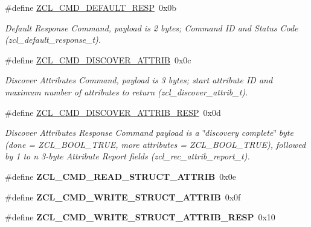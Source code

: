 \begin{DoxyCompactItemize}
\item 
\#define \hyperlink{group__zcl_ga92499f538455b8d5a525510fba54adb2}{Z\-C\-L\-\_\-\-C\-M\-D\-\_\-\-D\-E\-F\-A\-U\-L\-T\-\_\-\-R\-E\-S\-P}~0x0b
\begin{DoxyCompactList}\small\item\em Default Response Command, payload is 2 bytes; Command I\-D and Status Code (zcl\-\_\-default\-\_\-response\-\_\-t). \end{DoxyCompactList}\item 
\#define \hyperlink{group__zcl_ga2919d6fc8068efac4c9969938a4b9ff5}{Z\-C\-L\-\_\-\-C\-M\-D\-\_\-\-D\-I\-S\-C\-O\-V\-E\-R\-\_\-\-A\-T\-T\-R\-I\-B}~0x0c
\begin{DoxyCompactList}\small\item\em Discover Attributes Command, payload is 3 bytes; start attribute I\-D and maximum number of attributes to return (zcl\-\_\-discover\-\_\-attrib\-\_\-t). \end{DoxyCompactList}\item 
\#define \hyperlink{group__zcl_gae15c30229c1d8a8cdee1bd92b2cc6a15}{Z\-C\-L\-\_\-\-C\-M\-D\-\_\-\-D\-I\-S\-C\-O\-V\-E\-R\-\_\-\-A\-T\-T\-R\-I\-B\-\_\-\-R\-E\-S\-P}~0x0d
\begin{DoxyCompactList}\small\item\em Discover Attributes Response Command payload is a \char`\"{}discovery complete\char`\"{} byte (done = Z\-C\-L\-\_\-\-B\-O\-O\-L\-\_\-\-T\-R\-U\-E, more attributes = Z\-C\-L\-\_\-\-B\-O\-O\-L\-\_\-\-T\-R\-U\-E), followed by 1 to n 3-\/byte Attribute Report fields (zcl\-\_\-rec\-\_\-attrib\-\_\-report\-\_\-t). \end{DoxyCompactList}\item 
\hypertarget{group__zcl_ga6a1346696520f086e414bf00e535ef51}{\#define {\bfseries Z\-C\-L\-\_\-\-C\-M\-D\-\_\-\-R\-E\-A\-D\-\_\-\-S\-T\-R\-U\-C\-T\-\_\-\-A\-T\-T\-R\-I\-B}~0x0e}\label{group__zcl_ga6a1346696520f086e414bf00e535ef51}

\item 
\hypertarget{group__zcl_ga319ebdd453d91eb2fa8ca8334a313e2f}{\#define {\bfseries Z\-C\-L\-\_\-\-C\-M\-D\-\_\-\-W\-R\-I\-T\-E\-\_\-\-S\-T\-R\-U\-C\-T\-\_\-\-A\-T\-T\-R\-I\-B}~0x0f}\label{group__zcl_ga319ebdd453d91eb2fa8ca8334a313e2f}

\item 
\hypertarget{group__zcl_ga70640c0c70451c2f2a88dcb020a64298}{\#define {\bfseries Z\-C\-L\-\_\-\-C\-M\-D\-\_\-\-W\-R\-I\-T\-E\-\_\-\-S\-T\-R\-U\-C\-T\-\_\-\-A\-T\-T\-R\-I\-B\-\_\-\-R\-E\-S\-P}~0x10}\label{group__zcl_ga70640c0c70451c2f2a88dcb020a64298}

\end{DoxyCompactItemize}
